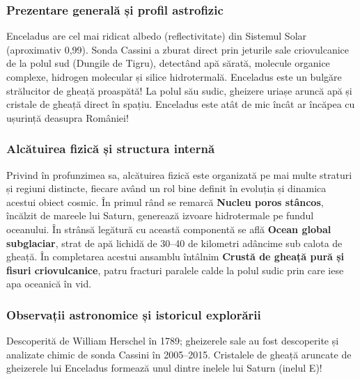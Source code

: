 \subsubsection*{Prezentare generală și profil astrofizic}
Enceladus are cel mai ridicat albedo (reflectivitate) din Sistemul Solar (aproximativ 0,99). Sonda Cassini a zburat direct prin jeturile sale criovulcanice de la polul sud (\guillemotleft{}Dungile de Tigru\guillemotright{}), detectând apă sărată, molecule organice complexe, hidrogen molecular și silice hidrotermală. Enceladus este un bulgăre strălucitor de gheață proaspătă! La polul său sudic, gheizere uriașe aruncă apă și cristale de gheață direct în spațiu. Enceladus este atât de mic încât ar încăpea cu ușurință deasupra României!

\subsubsection*{Alcătuirea fizică și structura internă}
Privind în profunzimea sa, alcătuirea fizică este organizată pe mai multe straturi și regiuni distincte, fiecare având un rol bine definit în evoluția și dinamica acestui obiect cosmic. În primul rând se remarcă \textbf{Nucleu poros stâncos}, încălzit de mareele lui Saturn, generează izvoare hidrotermale pe fundul oceanului. În strânsă legătură cu această componentă se află \textbf{Ocean global subglaciar}, strat de apă lichidă de 30--40 de kilometri adâncime sub calota de gheață. În completarea acestui ansamblu întâlnim \textbf{Crustă de gheață pură și fisuri criovulcanice}, patru fracturi paralele calde la polul sudic prin care iese apa oceanică în vid.

\subsubsection*{Observații astronomice și istoricul explorării}
Descoperită de William Herschel în 1789; gheizerele sale au fost descoperite și analizate chimic de sonda Cassini în 2005--2015. Cristalele de gheață aruncate de gheizerele lui Enceladus formează unul dintre inelele lui Saturn (inelul E)!


